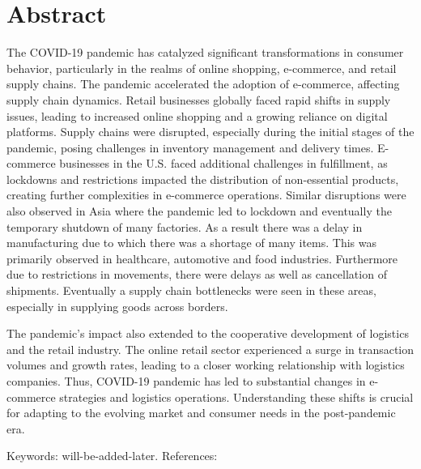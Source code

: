 \thispagestyle{plain}			%
\section*{Abstract}

The COVID-19 pandemic has catalyzed significant transformations in consumer behavior, particularly in the realms of online shopping, e-commerce, and retail supply chains. The pandemic accelerated the adoption of e-commerce, affecting supply chain dynamics. Retail businesses globally faced rapid shifts in supply issues, leading to increased online shopping and a growing reliance on digital platforms. Supply chains were disrupted, especially during the initial stages of the pandemic, posing challenges in inventory management and delivery times. E-commerce businesses in the U.S. faced additional challenges in fulfillment, as lockdowns and restrictions impacted the distribution of non-essential products, creating further complexities in e-commerce operations. Similar disruptions were also observed in Asia where the pandemic led to lockdown and eventually the temporary shutdown of many factories. As a result there was a delay in manufacturing due to which there was a shortage of many items. This was primarily observed in healthcare, automotive and food industries. Furthermore due to restrictions in movements, there were delays as well as cancellation of shipments. Eventually a supply chain bottlenecks were seen in these areas, especially in supplying goods across borders.

The pandemic's impact also extended to the cooperative development of logistics and the retail industry. The online retail sector experienced a surge in transaction volumes and growth rates, leading to a closer working relationship with logistics companies. Thus, COVID-19 pandemic has led to substantial changes in e-commerce strategies and logistics operations. Understanding these shifts is crucial for adapting to the evolving market and consumer needs in the post-pandemic era.

\vfill
Keywords: will-be-added-later. 
\break
References: \parencite{fryer_2020_understanding, zhao_2018_research, Musella2023TheFragilities}

\newpage				%
\thispagestyle{empty}
\mbox{}